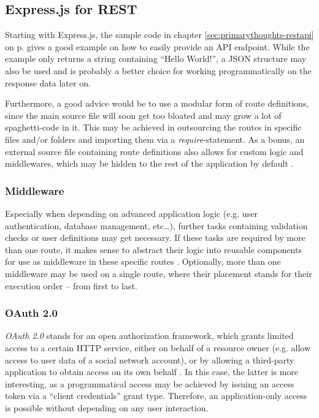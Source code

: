 \subsection{Express.js for REST}
\label{sec:foundation-express}
Starting with Express.js, the sample code in chapter \ref{sec:primarythoughts-restapi} on p. \pageref{sec:primarythoughts-restapi} gives a good example on how to easily provide an API endpoint. While the example only returns a string containing ``Hello World!'', a JSON structure may also be used and is probably a better choice for working programmatically on the response data later on.

Furthermore, a good advice would be to use a modular form of route definitions, since the main source file will soon get too bloated and may grow a lot of spaghetti-code in it. This may be achieved in outsourcing the routes in specific files and/or folders and importing them via a \emph{require}-statement. As a bonus, an external source file containing route definitions also allows for custom logic and middlewares, which may be hidden to the rest of the application by default \cite[p. 220f]{cantelon2017node}.

\subsubsection{Middleware}
Especially when depending on advanced application logic (e.g. user authentication, database management, etc\ldots), further tasks containing validation checks or user definitions may get necessary. If these tasks are required by more than one route, it makes sense to abstract their logic into reusable components for use as middleware in these specific routes \cite[223]{cantelon2017node}. Optionally, more than one middleware may be used on a single route, where their placement stands for their execution order -- from first to last.



\subsubsection{OAuth 2.0}
\emph{OAuth 2.0} stands for an open authorization framework, which grants limited access to a certain HTTP service, either on behalf of a resource owner (e.g. allow access to user data of a social network account), or by allowing a third-party application to obtain access on its own behalf \cite[1]{hardt2012oauth}. In this case, the latter is more interesting, as a programmatical access may be achieved by issuing an access token via a ``client credentials'' grant type. Therefore, an application-only access is possible without depending on any user interaction.

